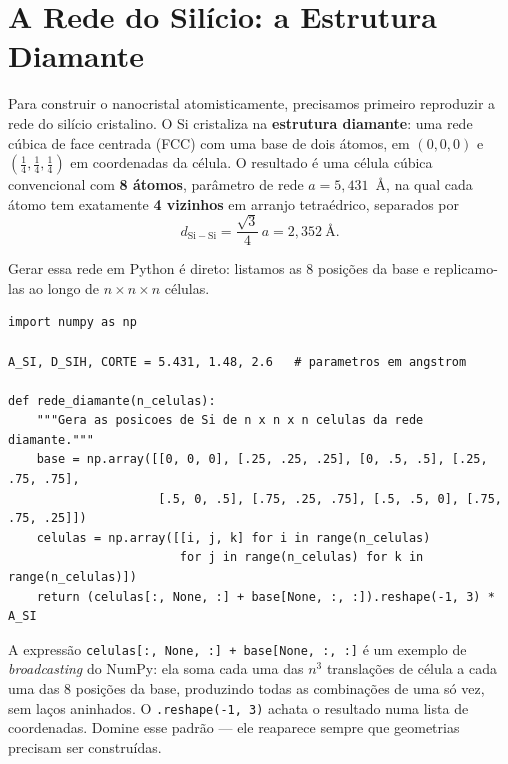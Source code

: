 \documentclass[11pt,a4paper,openany]{book}
\newcommand{\code}[1]{\texttt{#1}}
\newcommand{\numpy}{\textsf{NumPy}}
\newcommand{\python}{\textsf{Python}}
\begin{document}
\section{A Rede do Silício: a Estrutura Diamante}
\label{sec:rede}

Para construir o nanocristal atomisticamente, precisamos primeiro reproduzir a
rede do silício cristalino. O Si cristaliza na \textbf{estrutura diamante}: uma
rede cúbica de face centrada (FCC) com uma base de dois átomos, em
$(0,0,0)$ e $(\tfrac14,\tfrac14,\tfrac14)$ em coordenadas da célula. O resultado é
uma célula cúbica convencional com \textbf{8 átomos}, parâmetro de rede
$a = 5{,}431$~Å, na qual cada átomo tem exatamente \textbf{4 vizinhos} em arranjo
tetraédrico, separados por
\[
  d_{\mathrm{Si-Si}} = \frac{\sqrt{3}}{4}\,a = 2{,}352~\text{Å}.
\]

\noindent
Gerar essa rede em \python{} é direto: listamos as 8 posições da base e replicamo-las
ao longo de $n \times n \times n$ células.

\begin{lstlisting}[style=python,caption={Gerando a rede diamante do silício.},label={lst:rede}]
import numpy as np

A_SI, D_SIH, CORTE = 5.431, 1.48, 2.6   # parametros em angstrom

def rede_diamante(n_celulas):
    """Gera as posicoes de Si de n x n x n celulas da rede diamante."""
    base = np.array([[0, 0, 0], [.25, .25, .25], [0, .5, .5], [.25, .75, .75],
                     [.5, 0, .5], [.75, .25, .75], [.5, .5, 0], [.75, .75, .25]])
    celulas = np.array([[i, j, k] for i in range(n_celulas)
                        for j in range(n_celulas) for k in range(n_celulas)])
    return (celulas[:, None, :] + base[None, :, :]).reshape(-1, 3) * A_SI
\end{lstlisting}

\begin{caixadica}
A expressão \code{celulas[:, None, :] + base[None, :, :]} é um exemplo de
\emph{broadcasting} do \numpy{}: ela soma cada uma das $n^3$ translações de célula
a cada uma das 8 posições da base, produzindo todas as combinações de uma só vez,
sem laços aninhados. O \code{.reshape(-1, 3)} achata o resultado numa lista de
coordenadas. Domine esse padrão --- ele reaparece sempre que geometrias precisam
ser construídas.
\end{caixadica}
\end{document}
